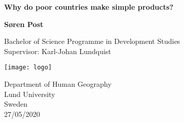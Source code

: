\begin{titlepage}
    \begin{center}
        \vspace*{1cm}

        \Huge
        \textbf{Why do poor countries make simple products?}

        \vspace{0.5cm}
        \LARGE

        \vspace{1.5cm}

        \textbf{Søren Post}

        \vfill

     Bachelor of Science Programme in Development Studies \\
     Supervisor: Karl-Johan Lundquist

        \vspace{0.8cm}

        \texttt{[image: logo]}

        \Large
        Department of Human Geography\\
        Lund University\\
        Sweden\\
        27/05/2020

    \end{center}
\end{titlepage}
